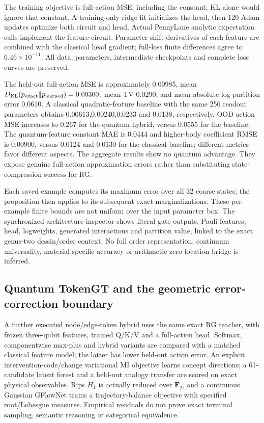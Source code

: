 \documentclass[11pt,oneside,openany]{book}
\theoremstyle{definition}\newtheorem{definition}[theorem]{Definition}
\theoremstyle{remark}\newtheorem{remark}[theorem]{Remark}
\begin{document}
The training objective is full-action MSE, including the constant; KL alone
would ignore that constant. A training-only ridge fit initializes the head,
then 120 Adam updates optimize both circuit and head. Actual PennyLane
analytic expectation calls implement the feature circuit. Parameter-shift
derivatives of each feature are combined with the classical head gradient;
full-loss finite differences agree to $6.46\times 10^{-11}$. All data,
parameters, intermediate checkpoints and complete loss curves are preserved.

The held-out full-action MSE is approximately 0.00985, mean
$ D_{\mathrm{KL}}(p_{\rm exact}\Vert p_{\rm learned})=0.00300$, mean TV 0.0290,
and mean absolute log-partition error 0.0610. A classical quadratic-feature
baseline with the same 256 readout parameters obtains 0.00613,0.00240,0.0233
and 0.0138, respectively. OOD action MSE increases to 0.267 for the quantum
hybrid, versus 0.0555 for the baseline. The quantum-feature constant MAE is 0.0444 and higher-body coefficient
RMSE is 0.00900, versus 0.0124 and 0.0130 for the classical baseline; different
metrics favor different aspects. The aggregate results show no quantum
advantage. They expose genuine full-action approximation errors rather
than substituting state-compression success for RG.

Each saved example computes its maximum error over all 32 coarse states;
the proposition then applies to its subsequent exact marginalizations.
These per-example finite bounds are not uniform over the input parameter
box. The synchronized architecture inspector shows literal gate outputs,
Pauli features, head, logweights, generated interactions and partition
value, linked to the exact genus-two dessin/order context. No full order
representation, continuum universality, material-specific accuracy or
arithmetic zero-location bridge is inferred.

\subsection{Quantum TokenGT and the geometric error-correction boundary}
A further executed node/edge-token hybrid uses the same exact RG teacher,
with frozen three-qubit features, trained Q/K/V and a full-action head.
Softmax, componentwise max-plus and hybrid variants are compared with a
matched classical feature model; the latter has lower held-out action error.
An explicit intervention-code/change variational MI objective learns concept
directions; a 61-candidate latent forest and a held-out analogy transfer are
scored on exact physical observables. Rips $ H_1$ is actually reduced over
$\mathbf F_2$, and a continuous Gaussian GFlowNet trains a trajectory-balance
objective with specified root/Lebesgue measures. Empirical residuals do not
prove exact terminal sampling, semantic reasoning or categorical equivalence.
\end{document}
